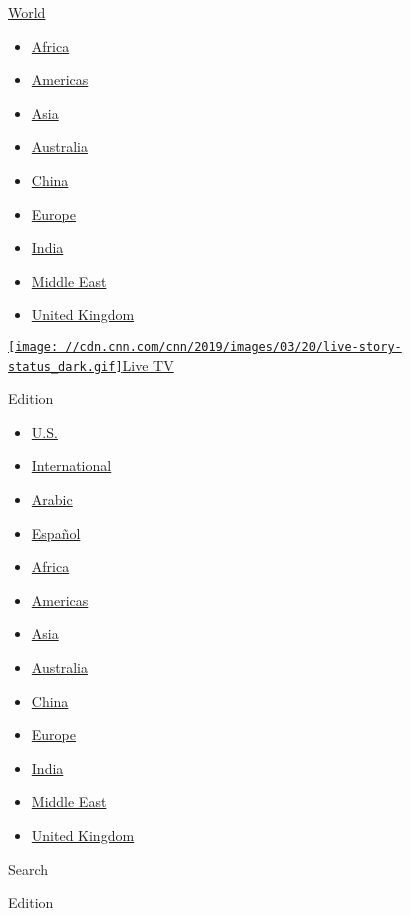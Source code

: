 \href{/world}{World}

\begin{itemize}
\tightlist
\item
  \href{/africa}{Africa}
\item
  \href{/americas}{Americas}
\item
  \href{/asia}{Asia}
\item
  \href{/australia}{Australia}
\item
  \href{/china}{China}
\item
  \href{/europe}{Europe}
\item
  \href{/india}{India}
\item
  \href{/middle-east}{Middle East}
\item
  \href{/uk}{United Kingdom}
\end{itemize}

\href{http://cnn.it/go2}{\texttt{[image: //cdn.cnn.com/cnn/2019/images/03/20/live-story-status\_dark.gif]}Live
TV}

Edition

\begin{itemize}
\tightlist
\item
  \href{//us.cnn.com?hpt=header?hpt=header_edition-picker}{U.S.}
\item
  \href{//edition.cnn.com?hpt=header?hpt=header_edition-picker}{International}
\item
  \href{//arabic.cnn.com?hpt=header?hpt=header_edition-picker}{Arabic}
\item
  \href{//cnnespanol.cnn.com/?hpt=header?hpt=header_edition-picker}{Español}
\end{itemize}

\begin{itemize}
\tightlist
\item
  \href{/africa}{Africa}
\item
  \href{/americas}{Americas}
\item
  \href{/asia}{Asia}
\item
  \href{/australia}{Australia}
\item
  \href{/china}{China}
\item
  \href{/europe}{Europe}
\item
  \href{/india}{India}
\item
  \href{/middle-east}{Middle East}
\item
  \href{/uk}{United Kingdom}
\end{itemize}

Search

Edition

